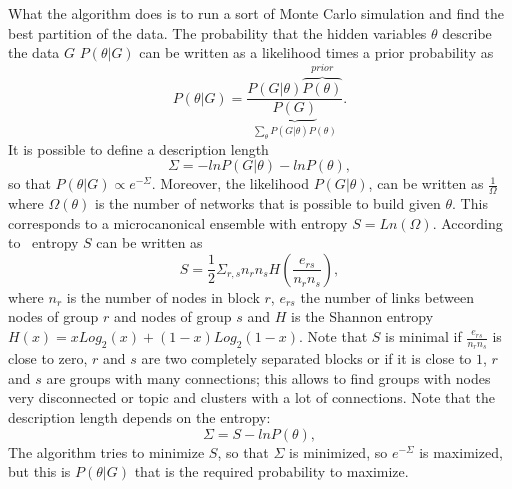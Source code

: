 What the algorithm does is to run a sort of Monte Carlo simulation and find the best partition of the data.
The probability that the hidden variables $\theta$ describe the data $G$ $P(\theta | G)$ can be written as a likelihood times a prior probability as 
\[P(\theta|G)=\frac{P(G|\theta)\overbrace{P(\theta)}^{prior}}{\underbrace{P(G)}_{\sum_{\theta}P(G|\theta)P(\theta)}}.\]
It is possible to define a description length
\[
\Sigma=-lnP(G|\theta)-lnP(\theta),
\]
so that $P(\theta | G)\propto e^{-\Sigma}$.
Moreover, the likelihood $P(G | \theta)$, can be written as $\frac{1}{\Omega}$ where $\Omega(\theta)$ is the number of networks that is possible to build given $\theta$. This corresponds to a microcanonical ensemble with entropy $S=Ln\left(\Omega\right)$. According to~\cite{peixoto2017nonparametric} entropy $S$ can be written as
\[
S=\frac{1}{2}\Sigma_{r,s} n_r n_s H\left(\frac{e_{rs}}{n_rn_s}\right),
\]
where $n_r$ is the number of nodes in block $r$, $e_{rs}$ the number of links between nodes of group $r$ and nodes of group $s$ and $H$ is the Shannon entropy $H(x)=xLog_2(x)+(1-x)Log_2(1-x)$. Note that $S$ is minimal if $\frac{e_{rs}}{n_rn_s}$ is close to zero, $r$ and $s$ are two completely separated blocks or if it is close to $1$, $r$ and $s$ are groups with many connections; this allows to find groups with nodes very disconnected or topic and clusters with a lot of connections. Note that the description length depends on the entropy:
\[
\Sigma=S-lnP(\theta),
\]
The algorithm tries to minimize $S$, so that $\Sigma$ is minimized, so $e^{-\Sigma}$ is maximized, but this is $P(\theta | G)$ that is the required probability to maximize.

